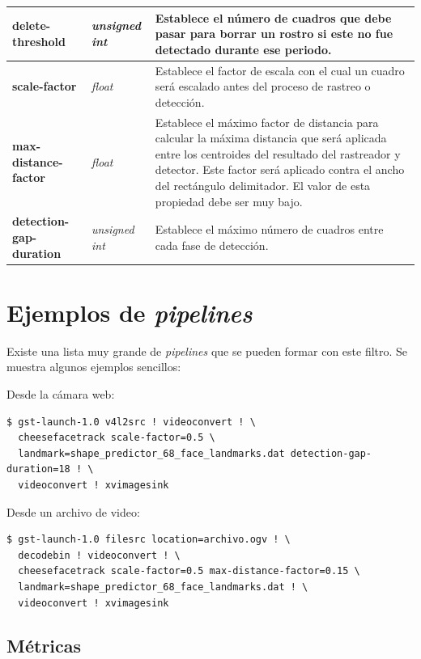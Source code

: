 \documentclass[a4paper,openright,12pt]{report}
\begin{document}
\begin{center}
\begin{longtable}{| p{} | p{} | p{} |}
  \textbf{delete-threshold} &
  \textit{unsigned int} &
  Establece el número de cuadros que debe pasar para borrar un rostro si este
  no fue detectado durante ese periodo.
  \\ \hline

  \textbf{scale-factor} &
  \textit{float} &
  Establece el factor de escala con el cual un cuadro será escalado antes del
  proceso de rastreo o detección.
  \\ \hline

  \textbf{max-distance-factor} &
  \textit{float} &
  Establece el máximo factor de distancia para calcular la máxima distancia que
  será aplicada entre los centroides del resultado del rastreador y detector.
  Este factor será aplicado contra el ancho del rectángulo delimitador. El valor
  de esta propiedad debe ser muy bajo.
  \\ \hline


  \textbf{detection-gap-duration} &
  \textit{unsigned int} &
  Establece el máximo número de cuadros entre cada fase de detección.
  \\ \hline
  \end{longtable}
\end{center}

\section{Ejemplos de \textit{pipelines}}
Existe una lista muy grande de \textit{pipelines} que se pueden formar con este
filtro. Se muestra algunos ejemplos sencillos:

Desde la cámara web:
\begin{verbatim}
$ gst-launch-1.0 v4l2src ! videoconvert ! \
  cheesefacetrack scale-factor=0.5 \
  landmark=shape_predictor_68_face_landmarks.dat detection-gap-duration=18 ! \
  videoconvert ! xvimagesink
\end{verbatim}

Desde un archivo de video:
\begin{verbatim}
$ gst-launch-1.0 filesrc location=archivo.ogv ! \
  decodebin ! videoconvert ! \
  cheesefacetrack scale-factor=0.5 max-distance-factor=0.15 \
  landmark=shape_predictor_68_face_landmarks.dat ! \
  videoconvert ! xvimagesink
\end{verbatim}

\subsection{Métricas}
\end{document}
